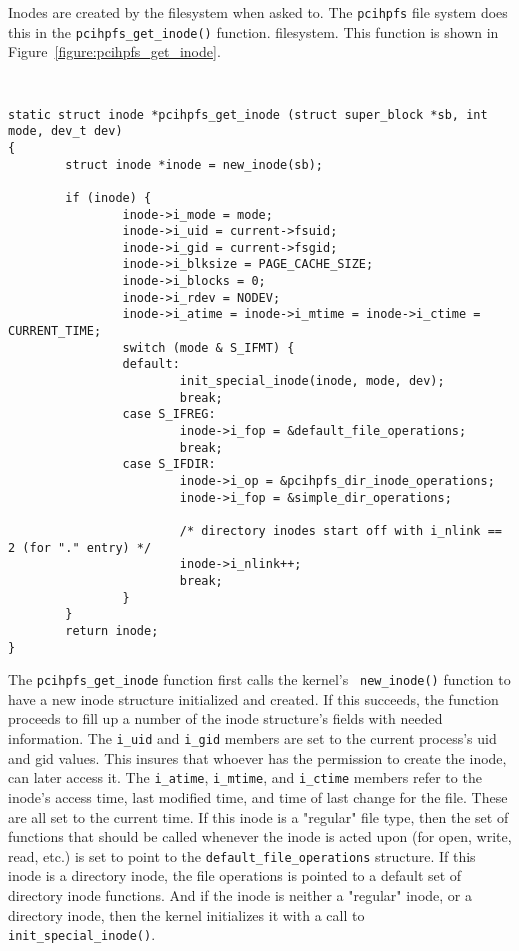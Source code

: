 \documentclass[twocolumn]{article}
\begin{document}
Inodes are created by the filesystem when asked to.  The {\tt pcihpfs} file
system does this in the {\tt pcihpfs\_get\_inode()} function.
filesystem. This function is shown in Figure~\ref{figure:pcihpfs_get_inode}.

\begin{figure*}[tb]
{\tt \small
\begin{verbatim}
static struct inode *pcihpfs_get_inode (struct super_block *sb, int mode, dev_t dev)
{
        struct inode *inode = new_inode(sb);

        if (inode) {
                inode->i_mode = mode;
                inode->i_uid = current->fsuid;
                inode->i_gid = current->fsgid;
                inode->i_blksize = PAGE_CACHE_SIZE;
                inode->i_blocks = 0;
                inode->i_rdev = NODEV;
                inode->i_atime = inode->i_mtime = inode->i_ctime = CURRENT_TIME;
                switch (mode & S_IFMT) {
                default:
                        init_special_inode(inode, mode, dev);
                        break;
                case S_IFREG:
                        inode->i_fop = &default_file_operations;
                        break;
                case S_IFDIR:
                        inode->i_op = &pcihpfs_dir_inode_operations;
                        inode->i_fop = &simple_dir_operations;

                        /* directory inodes start off with i_nlink == 2 (for "." entry) */
                        inode->i_nlink++;
                        break;
                }
        }
        return inode;
}
\end{verbatim}
}
\caption{\footnotesize{
{\tt pcihpfs\_get\_inode} from {\tt drivers/hotplug/pci\_hotplug\_core.c}}}
\label{figure:pcihpfs_get_inode}
\end{figure*}

The {\tt pcihpfs\_get\_inode} function first calls the kernel's {\tt
new\_inode()} function to have a new inode structure initialized and created.
If this succeeds, the function proceeds to fill up a number of the inode
structure's fields with needed information.
The {\tt i\_uid} and {\tt i\_gid} members are set to the current process's
uid and gid values.  This insures that whoever has the permission to create
the inode, can later access it.
The {\tt i\_atime}, {\tt i\_mtime}, and {\tt i\_ctime} members refer to the
inode's access time, last modified time, and time of last change for the
file.  These are all set to the current time.  If this inode is a "regular"
file type, then the set of functions that should be called whenever the
inode is acted upon (for open, write, read, etc.) is set to point to the 
{\tt default\_file\_operations} structure.  If this inode is a directory
inode, the file operations is pointed to a default set of directory inode
functions.  And if the inode is neither a "regular" inode, or a directory
inode, then the kernel initializes it with a call to 
{\tt init\_special\_inode()}.
\end{document}

